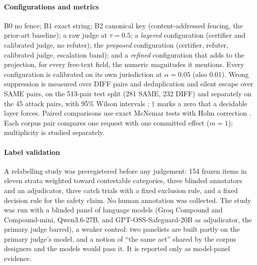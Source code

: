 \paragraph{Configurations and metrics}
B0 no fence; B1 exact string; B2 canonical key (content-addressed fencing, the prior-art baseline); a raw judge at $\tau=0.5$; a \emph{layered} configuration (certifier and calibrated judge, no refuter); the \emph{proposed} configuration (certifier, refuter, calibrated judge, escalation band); and a \emph{refined} configuration that adds to the projection, for every free-text field, the numeric magnitudes it mentions. Every configuration is calibrated on its own jurisdiction at $\alpha=0.05$ (also $0.01$). Wrong suppression is measured over DIFF pairs and deduplication and silent escape over SAME pairs, on the 513-pair test split (281 SAME, 232 DIFF) and separately on the 45 attack pairs, with 95\% Wilson intervals \citep{wilson1927}; $\dagger$ marks a zero that a decidable layer forces. Paired comparisons use exact McNemar tests \citep{mcnemar1947} with Holm correction \citep{holm1979}. Each corpus pair compares one request with one committed effect ($m=1$); multiplicity is studied separately.

\paragraph{Label validation}
A relabelling study was preregistered before any judgement: 154 frozen items in eleven strata weighted toward contestable categories, three blinded annotators and an adjudicator, three catch trials with a fixed exclusion rule, and a fixed decision rule for the safety claim. No human annotation was collected. The study was run with a blinded panel of language models (Groq Compound and Compound-mini, Qwen3.6-27B, and GPT-OSS-Safeguard-20B as adjudicator, the primary judge barred), a weaker control: two panelists are built partly on the primary judge's model, and a notion of ``the same act'' shared by the corpus designers and the models would pass it. It is reported only as model-panel evidence.
